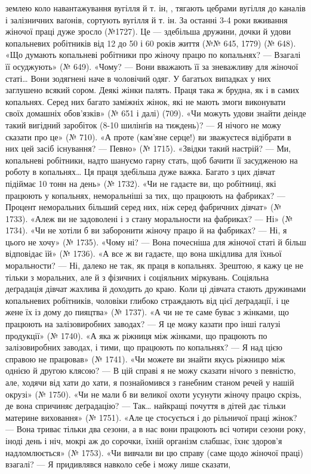 \parcont{}  %
землею коло навантажування вугілля й т. ін, , тягають цебрами
вугілля до каналів і залізничних ваґонів, сортують вугілля й
т. ін. За останні 3-4 роки вживання жіночої праці дуже зросло
(№1727). Це — здебільша дружини, дочки й удови копальневих
робітників від 12 до 50 і 60 років життя (№№ 645, 1779) (№ 648).
«Що думають копальневі робітники про жіночу працю по копальнях?
— Взагалі її осуджують» (№ 649). «Чому? — Вони вважають
її за зневажливу для жіночої статі\dots{} Вони зодягнені наче в чоловічий
одяг. У багатьох випадках у них заглушено всякий сором.
Деякі жінки палять. Праця така ж брудна, як і в самих копальнях.
Серед них багато заміжніх жінок, які не мають змоги виконувати
своїх домашніх обов’язків» (№ 651 і далі) (709). «Чи
можуть удови знайти деінде такий вигідний заробіток (8-10
шилінґів на тиждень)? — Я нічого не можу сказати про це»
(№ 710). «А проте (кам’яне серце!) ви зважуєтеся відібрати в
них цей засіб існування? — Певно» (№ 1715). «Звідки такий
настрій? — Ми, копальневі робітники, надто шануємо гарну
стать, щоб бачити її засудженою на роботу в копальнях\dots{} Ця
праця здебільша дуже важка. Багато з цих дівчат підіймає
10 тонн на день» (№ 1732). «Чи не гадаєте ви, що робітниці, які
працюють у копальнях, неморальніші за тих, що працюють на
фабриках? — Процент неморальних більший серед них, ніж серед
фабричних дівчат» (№ 1733). «Алеж ви не задоволені і з стану
моральности на фабриках? — Ні» (№ 1734). «Чи не хотіли б ви
заборонити жіночу працю й на фабриках? — Ні, я цього не хочу»
(№ 1735). «Чому ні? — Вона почесніша для жіночої статі й більш
відповідає їй» (№ 1736). «А все ж ви гадаєте, що вона шкідлива
для їхньої моральности? — Ні, далеко не так, як праця в копальнях.
Зрештою, я кажу це не тільки з моральних, але й з фізичних
і соціяльних міркувань. Соціяльна деґрадація дівчат жахлива
й доходить до краю. Коли ці дівчата стають дружинами копальневих
робітників, чоловіки глибоко страждають від цієї деґрадації,
і це жене їх із дому до пияцтва» (№ 1737). «А чи не те саме буває
з жінками, що працюють на залізовиробних заводах? — Я це
можу казати про інші галузі продукції» (№ 1740). «А яка ж ріжниця
між жінками, що працюють по залізовиробних заводах,
і тими, що працюють по копальнях? — Я над цією справою не
працював» (№ 1741). «Чи можете ви знайти якусь ріжницю
між однією й другою клясою? — В цій справі я не можу сказати
нічого з певністю, але, ходячи від хати до хати, я познайомився
з ганебним станом речей у нашій окрузі» (№ 1750). «Чи не мали б
ви великої охоти усунути жіночу працю скрізь, де вона спричиняє
деґрадацію? — Так\dots{} найкращі почуття в дітей дає тільки материне
виховання» (№ 1751). «Але це стосується і до рільничої
праці жінок? — Вона триває тільки два сезони, а в нас вони працюють
всі чотири сезони року, іноді день і ніч, мокрі аж до
сорочки, їхній організм слабшає, їхнє здоров’я надломлюється»
(№ 1753). «Чи вивчали ви цю справу (саме щодо жіночої праці)
взагалі? — Я придивлявся навколо себе і можу лише сказати,
\parbreak{}  %
